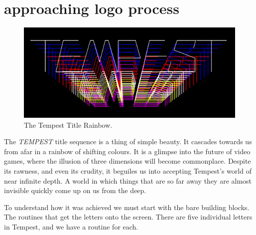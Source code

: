 \chapter{approaching logo process}
\label{sec:tempest_logo}
\lhead[tempest]{}
\lstset{style=6502Style}

\begin{figure}[H]
    \centering
    \begin{adjustbox}{width=11cm,center}
      \includegraphics[width=12cm]{src/titles/title.png}%
    \end{adjustbox}
  \caption{The Tempest Title Rainbow.}
\end{figure}

The \textit{TEMPEST} title sequence is a thing of simple beauty. It cascades towards
us from afar in a rainbow of shifting colours. It is a glimpse into the future of video
games, where the illusion of three dimensions will become commonplace. Despite its rawness,
and even its crudity, it beguiles us into accepting Tempest's world of near infinite depth.
A world in which things that are so far away they are almost invisible quickly come up on us
from the deep.

To understand how it was achieved we must start with the bare building blocks. The routines that
get the letters onto the screen. There are five individual letters in Tempest, and we have a routine
for each.

